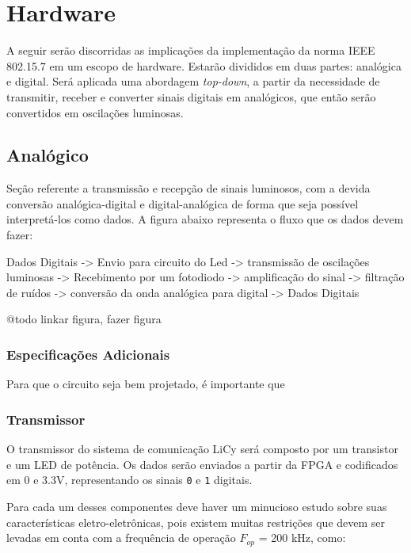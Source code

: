 	\section{Hardware}\label{sec-hardware}
	
	A seguir serão discorridas as implicações da implementação da norma IEEE 802.15.7 em um escopo de hardware. Estarão divididos em duas partes: analógica e digital. Será aplicada uma abordagem \textit{top-down}, a partir da necessidade de transmitir, receber e converter sinais digitais em analógicos, que então serão convertidos em oscilações luminosas.
	
	\subsection{Analógico}
	
	Seção referente a transmissão e recepção de sinais luminosos, com a devida conversão analógica-digital e digital-analógica de forma que seja possível interpretá-los como dados. A figura abaixo representa o fluxo que os dados devem fazer:
	
	Dados Digitais -> Envio para circuito do Led -> transmissão de oscilações luminosas ->
	Recebimento por um fotodiodo -> amplificação do sinal -> filtração de ruídos -> conversão da onda analógica para digital -> Dados Digitais
	
	@todo linkar figura, fazer figura
	
	\subsubsection{Especificações Adicionais}
	
	Para que o circuito seja bem projetado, é importante que 
	
	\subsubsection{Transmissor}
	
	O transmissor do sistema de comunicação LiCy será composto por um transistor e um LED de potência. Os dados serão enviados a partir da FPGA e codificados em 0 e 3.3V, representando os sinais \texttt{0} e \texttt{1} digitais. 
	
	Para cada um desses componentes deve haver um minucioso estudo sobre suas características eletro-eletrônicas, pois existem muitas restrições que devem ser levadas em conta com a frequência de operação $F_{op}$ = 200 kHz, como:
		
